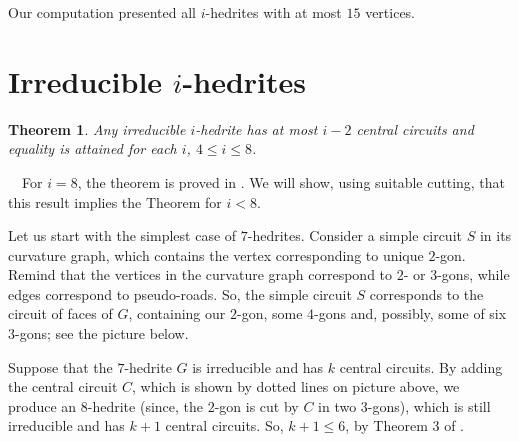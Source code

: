 \documentclass[12pt]{article}
\newtheorem{theorem}{Theorem}
\newcommand{\proof}{\noindent{\bf Proof.}\ \ }
\begin{document}
 


Our computation presented all $i$-hedrites with at most $15$ vertices. 











\section{Irreducible $i$-hedrites}



\begin{theorem}\label{irre}
Any irreducible $i$-hedrite has at most $i-2$ central circuits and equality is attained for each $i$, $4\leq i\leq 8$.
\end{theorem}
\proof For $i=8$, the theorem is proved in \cite{DSt}. We will show, using suitable cutting, that this result implies the Theorem for $i<8$.

Let us start with the simplest case of $7$-hedrites. Consider a simple circuit $S$ in its curvature graph, which contains the vertex corresponding to unique $2$-gon. Remind that the vertices in the curvature graph correspond to $2$- or $3$-gons, while edges correspond to pseudo-roads. So, the simple circuit $S$ corresponds to the circuit of faces of $G$, containing our $2$-gon, some $4$-gons and, possibly, some of six $3$-gons; see the picture below.


\begin{center}
\epsfxsize=40mm
\end{center}






Suppose that the $7$-hedrite $G$ is irreducible and has $k$ central circuits. By adding the central circuit $C$, which is shown by dotted lines on picture above, we produce an $8$-hedrite (since, the $2$-gon is cut by $C$ in two $3$-gons), which is still irreducible and has $k+1$ central circuits. So, $k+1\leq 6$, by Theorem 3 of \cite{DSt}.
\end{document}
